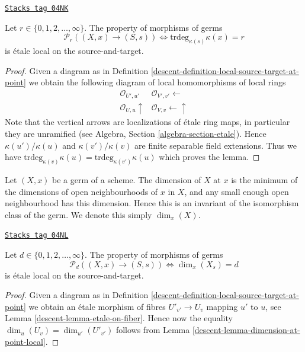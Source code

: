 \begin{lemma}
\label{descent-lemma-transcendence-degree-at-point}
\href{https://stacks.math.columbia.edu/tag/04NK}{\texttt{Stacks tag 04NK}}

Let $r \in \{0, 1, 2, \ldots, \infty\}$.
The property of morphisms of germs
$$
\mathcal{P}_r((X, x) \to (S, s))
\Leftrightarrow
\text{trdeg}_{\kappa(s)} \kappa(x) = r
$$
is \'etale local on the source-and-target.
\end{lemma}

\begin{proof}

Given a diagram as in
Definition \ref{descent-definition-local-source-target-at-point}
we obtain the following diagram of local homomorphisms of local rings
$$
\begin{array}{cc}\mathcal{O}_{U', u'} & \mathcal{O}_{V', v'} \longleftarrow \\ \mathcal{O}_{U, u} \uparrow & \mathcal{O}_{V, v} \longleftarrow\uparrow\end{array}
$$
Note that the vertical arrows are localizations of \'etale ring maps,
in particular they are unramified (see
Algebra, Section \ref{algebra-section-etale}).
Hence $\kappa(u')/\kappa(u)$ and $\kappa(v')/\kappa(v)$
are finite separable field extensions.
Thus we have
$\text{trdeg}_{\kappa(v)} \kappa(u) = \text{trdeg}_{\kappa(v')} \kappa(u)$
which proves the lemma.
\end{proof}

Let $(X, x)$ be a germ of a scheme.
The dimension of $X$ at $x$ is the minimum of the dimensions of
open neighbourhoods of $x$ in $X$, and any small enough open neighbourhood
has this dimension. Hence this is an invariant of the isomorphism class
of the germ. We denote this simply $\dim_x(X)$.

\begin{lemma}
\label{descent-lemma-dimension-at-point}
\href{https://stacks.math.columbia.edu/tag/04NL}{\texttt{Stacks tag 04NL}}

Let $d \in \{0, 1, 2, \ldots, \infty\}$.
The property of morphisms of germs
$$
\mathcal{P}_d((X, x) \to (S, s))
\Leftrightarrow
\dim_x (X_s) = d
$$
is \'etale local on the source-and-target.
\end{lemma}

\begin{proof}

Given a diagram as in
Definition \ref{descent-definition-local-source-target-at-point}
we obtain an \'etale morphism of fibres
$U'_{v'} \to U_v$ mapping $u'$ to $u$, see
Lemma \ref{descent-lemma-etale-on-fiber}.
Hence now the equality $\dim_u(U_v) = \dim_{u'}(U'_{v'})$ follows from
Lemma \ref{descent-lemma-dimension-at-point-local}.
\end{proof}

